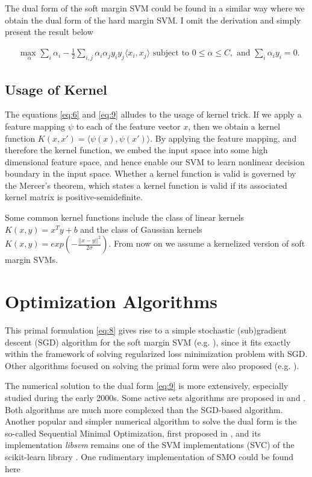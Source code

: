 \documentclass[10pt]{article}
\begin{document}
The dual form of the soft margin SVM could be found in a similar way where we obtain the dual form of the hard margin SVM. I omit the derivation and simply present the result below

\begin{equation} \label{eq:9}
\begin{aligned}
& \underset{\alpha}{\text{max }} 
\sum_{i}^{}\alpha_i - \frac{1}{2} \sum_{i,j}^{}\alpha_i \alpha_j y_i y_j \langle x_i, x_j\rangle
\text{ subject to }
0 \leq \alpha \leq C, \text{ and }
\sum_{i}^{} \alpha_i y_i = 0.
\end{aligned}
\end{equation}


\subsection{Usage of Kernel}
The equations \eqref{eq:6} and \eqref{eq:9} alludes to the usage of kernel trick. If we apply a feature mapping $\psi$ to each of the feature vector $x$, then we obtain a kernel function $K(x,x') = \langle \psi(x), \psi(x')\rangle$. By applying the feature mapping, and therefore the kernel function, we embed the input space into some high dimensional feature space, and hence enable our SVM to learn nonlinear decision boundary in the input space. Whether a kernel function is valid is governed by the Mercer's theorem, which states a kernel function is valid if its associated kernel matrix is positive-semidefinite.

Some common kernel functions include the class of linear kernels $K(x,y) = x^T y + b$ and the class of Gaussian kernels $K(x,y) = exp(- \frac{||x - y||^2}{2\sigma})$. From now on we assume a kernelized version of soft margin SVMs.

\section{Optimization Algorithms}
This primal formulation \eqref{eq:8} gives rise to a simple stochastic (sub)gradient descent (SGD) algorithm for the soft margin SVM (e.g. \cite{shalev2007online}), since it fits exactly within the framework of solving regularized loss minimization problem with SGD. Other algorithms focused on solving the primal form were also proposed (e.g. \cite{chapelle2007training}). 

The numerical solution to the dual form \eqref{eq:9} is more extensively, especially studied during the early 2000s. Some active sets algorithms are proposed in \cite{scheinberg2006efficient} and \cite{vogt2005active}. Both algorithms are much more complexed than the SGD-based algorithm. Another popular and simpler numerical algorithm to solve the dual form is the so-called Sequential Minimal Optimization, first proposed in \cite{platt1998sequential}, and its implementation \textit{libsvm} \cite{CC01a} remains one of the SVM implementations (SVC) of the scikit-learn library \cite{scikit-learn}. One rudimentary implementation of SMO could be found here \cite{svm_smo_impl}  
\end{document}
